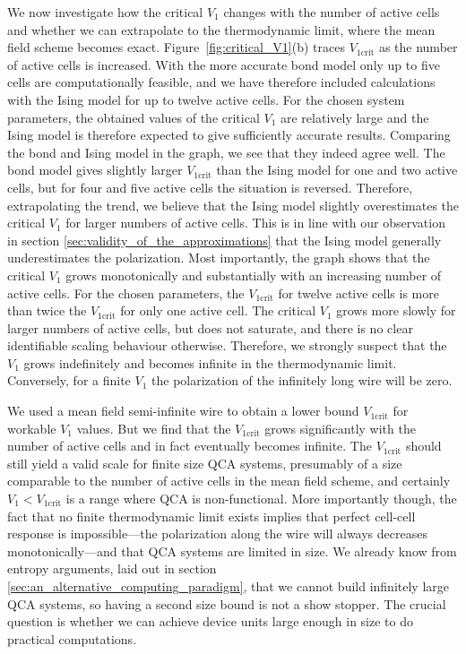 We now investigate how the critical $V_1$ changes with the number of active
cells and whether we can extrapolate to the thermodynamic limit, where the mean
field scheme becomes exact. Figure~\ref{fig:critical_V1}(b) traces
$V_{1\textrm{crit}}$ as the number of active cells is increased. With the more
accurate bond model only up to five cells are computationally feasible, and we
have therefore included calculations with the Ising model for up to twelve
active cells. For the chosen system parameters, the obtained values of the
critical $V_1$ are relatively large and the Ising model is therefore expected to
give sufficiently accurate results. Comparing the bond and Ising model in the
graph, we see that they indeed agree well. The bond model gives slightly larger
$V_{1\textrm{crit}}$ than the Ising model for one and two active cells, but for
four and five active cells the situation is reversed. Therefore, extrapolating
the trend, we believe that the Ising model slightly overestimates the critical
$V_1$ for larger numbers of active cells. This is in line with our observation
in section \ref{sec:validity_of_the_approximations} that the Ising model
generally underestimates the polarization. Most importantly, the graph shows
that the critical $V_1$ grows monotonically and substantially with an increasing
number of active cells. For the chosen parameters, the $V_{1\textrm{crit}}$ for
twelve active cells is more than twice the $V_{1\textrm{crit}}$ for only one
active cell. The critical $V_1$ grows more slowly for larger numbers of active
cells, but does not saturate, and there is no clear identifiable scaling
behaviour otherwise.  Therefore, we strongly suspect that the $V_1$ grows
indefinitely and becomes infinite in the thermodynamic limit. Conversely, for a
finite $V_1$ the polarization of the infinitely long wire will be zero.

We used a mean field semi-infinite wire to obtain a lower bound
$V_{1\textrm{crit}}$ for workable $V_1$ values. But we find that the
$V_{1\textrm{crit}}$ grows significantly with the number of active cells and in
fact eventually becomes infinite. The $V_{1\textrm{crit}}$ should still yield a
valid scale for finite size QCA systems, presumably of a size comparable to the
number of active cells in the mean field scheme, and certainly $V_1 <
V_{1\textrm{crit}}$ is a range where QCA is non-functional. More importantly
though, the fact that no finite thermodynamic limit exists implies that perfect
cell-cell response is impossible---the polarization along the wire will always
decreases monotonically---and that QCA systems are limited in size. We already
know from entropy arguments, laid out in section
\ref{sec:an_alternative_computing_paradigm}, that we cannot build infinitely
large QCA systems, so having a second size bound is not a show stopper. The
crucial question is whether we can achieve device units large enough in size to
do practical computations.

